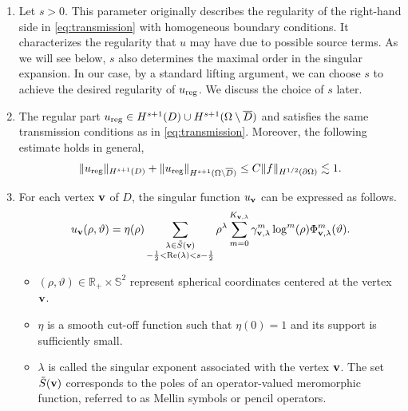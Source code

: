 ﻿\documentclass[11pt,reqno,oneside]{amsart}
\theoremstyle{definition}
\theoremstyle{remark}
\newcommand{\R}{\mathbb{R}}
\renewcommand{\S}{\mathbb{S}}
\renewcommand{\Re}{{\rm Re}}
\newcommand{\g}{\gamma}
\newcommand{\lm}{\lambda}
\newcommand{\p}{\partial}
\renewcommand{\O}{\Omega}
\begin{document}
    \begin{enumerate}
        \item Let $s>0$. This parameter originally describes the regularity of the right-hand side in \eqref{eq:transmission} with homogeneous boundary conditions. It characterizes the regularity that $u$ may have due to possible source terms. As we will see below, $s$ also determines the maximal order in the singular expansion. In our case, by a standard lifting argument, we can choose $s$ to achieve the desired regularity of $u_{\rm reg}$. We discuss the choice of $s$ later.
        \item The regular part $u_{\rm reg}\in H^{s+1}(D)\cup H^{s+1}(\O\setminus \overline{D})$ and satisfies the same transmission conditions as in \eqref{eq:transmission}. Moreover, the following estimate holds in general,
        \begin{align}\label{eq:esti-reg-cinqdemi}
            \|u_{\rm reg}\|_{H^{s+1}(D)}+\|u_{\rm reg}\|_{H^{s+1}(\O\setminus \overline{D})}\leq C \|f\|_{H^{1/2}(\p\O)}\lesssim 1.
        \end{align}\item For each vertex $\bf v$ of $D$, the singular function $u_{\bf v}$ can be expressed as follows.
         \begin{align*}
            u_{\bf v}(\rho,\vartheta)=\eta(\rho)\sum_{\begin{subarray}{c}
            \lm\in \tilde{S}({\bf v})\\ -\frac{1}{2}<\Re(\lm)<s-\frac{1}{2}
        \end{subarray}} \rho^\lm \sum_{m=0}^{K_{\bf v,\lm}}\g_{{\bf v},\lm}^m \log^m(\rho)\Phi_{{\bf v},\lm}^m(\vartheta).
         \end{align*}
         \begin{itemize}
            \item $(\rho,\vartheta)\in \R_+\times \S^2$ represent spherical coordinates centered at the vertex ${\bf v}$.
            \item $\eta$ is a smooth cut-off function such that $\eta(0)=1$ and its support is sufficiently small. %
            \item $\lm$ is called the singular exponent associated with the vertex ${\bf v}$. The set $\tilde{S}({\bf v})$ corresponds to the poles of an operator-valued meromorphic function, referred to as Mellin symbols or pencil operators.

\end{itemize}
\end{enumerate}
\end{document}
